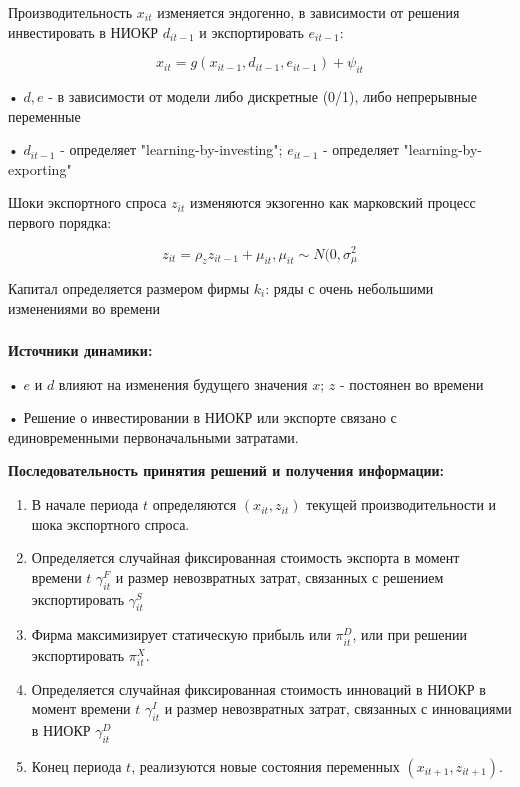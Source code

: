 \documentclass[c, dvipsnames]{beamer}  %
\begin{document}
\begin{frame}[shrink=3]
\frametitle{\insertsection} 

Производительность   $x_{it}$   изменяется эндогенно, в зависимости от решения инвестировать в НИОКР  $d_{it−1}$ 
и экспортировать $e_{it−1}$:

$$x_{it} = g(x_{it−1}, d_{it−1}, e_{it−1}) + \psi_{it}$$

• $d, e$ - в зависимости от модели либо дискретные (0/1), либо непрерывные переменные

• $d_{it−1}$ - определяет "learning-by-investing"; $e_{it−1}$ - определяет "learning-by-exporting"

Шоки экспортного спроса $z_{it}$ изменяются экзогенно как марковский процесс первого порядка:


$$z_{it} = \rho_z z_{it−1} + \mu_{it}, \mu_{it} \sim N(0, \sigma^2_{\mu}$$

Капитал определяется размером фирмы  $k_i$: ряды с очень небольшими изменениями во времени


\end{frame}





\begin{frame}[shrink=3]
\frametitle{\insertsection} 

\textbf{Источники динамики:}

• $e$ и $d$ влияют на изменения будущего значения $x$; 
 $z$ - постоянен во времени

• Решение о инвестировании в НИОКР или экспорте связано с единовременными первоначальными затратами.

\textbf{Последовательность принятия решений и получения информации:
}


\begin{enumerate}
	\item  В начале периода $t$ определяются $(x_{it}, z_{it})$  текущей производительности и шока экспортного спроса.
	
\item  Определяется случайная фиксированная стоимость экспорта в момент времени $t$ $\gamma^F_{it}$   и размер невозвратных затрат, связанных с решением экспортировать  $γ^S_{it}$ 

\item  Фирма максимизирует статическую прибыль или $\pi^D_{it}$,  или при решении экспортировать $\pi^X_{it}$.

\item  Определяется случайная фиксированная стоимость инноваций в НИОКР в момент времени $t$ $\gamma^I_{it}$   и размер невозвратных затрат, связанных с инновациями в НИОКР  $\gamma^D_{it} $

\item Конец периода $t$, реализуются новые состояния переменных $(x_{it+1}, z_{it+1})$.
\end{enumerate}
\end{frame}
\end{document}
